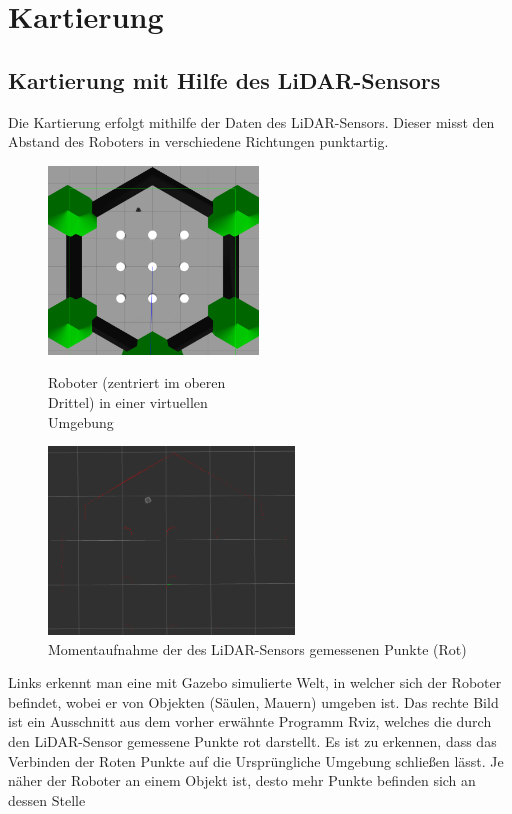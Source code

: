 \section{Kartierung}
{
	
	\subsection{Kartierung mit Hilfe des LiDAR-Sensors}
	{
		Die Kartierung erfolgt mithilfe der Daten des LiDAR-Sensors. Dieser misst den Abstand des Roboters in verschiedene Richtungen punktartig. \newline  
		\begin{figure}[H]
			\begin{minipage}{0.5\textwidth}
				\centering
				\includegraphics[height=5cm]{Bilder/virtualmap_world_gazebo.png}
				\caption{Roboter (zentriert im oberen \\ Drittel) in einer virtuellen \\Umgebung} %
				\label{pic:virtworldgazebo}
			\end{minipage}
			\begin{minipage}{0.5\textwidth}
				\centering
				\includegraphics[height=5cm]{Bilder/virtualmap_world_rviz.png}
				\caption{Momentaufnahme der des LiDAR-Sensors gemessenen Punkte (Rot)}
				\label{pic:virtworldlaserrviz}	
			\end{minipage}
		\end{figure}
		
		Links erkennt man eine mit Gazebo simulierte Welt, in welcher sich der Roboter befindet, wobei er von Objekten (Säulen, Mauern) umgeben ist. Das rechte Bild ist ein Ausschnitt aus dem vorher erwähnte Programm Rviz, welches die durch den LiDAR-Sensor gemessene Punkte rot darstellt. Es ist zu erkennen, dass das Verbinden der Roten Punkte auf die Ursprüngliche Umgebung schließen lässt. Je näher der Roboter an einem Objekt ist, desto mehr Punkte befinden sich an dessen Stelle
		
}}
